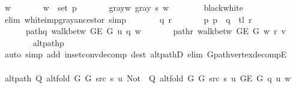 \begin{isabellebody}
\ w\ \isanewline
\ \ \ \ \ \ {\isachardoublequoteopen}w\ {\isasymin}\ set\ p{\isachardoublequoteclose}\ \isanewline
\ \ \ \ \ \ gray{\isacharunderscore}{\kern0pt}w{\isacharcolon}{\kern0pt}\ {\isachardoublequoteopen}gray\ s\ w{\isachardoublequoteclose}\isanewline
\ \ \ \ \ \ \isamarkupfalse%
\ black{\isacharunderscore}{\kern0pt}white\isanewline
\ \ \ \ \ \ \isamarkupfalse%
\ {\isacharparenleft}{\kern0pt}elim\ white{\isacharunderscore}{\kern0pt}imp{\isacharunderscore}{\kern0pt}gray{\isacharunderscore}{\kern0pt}ancestor{\isacharparenright}{\kern0pt}\ simp{\isacharplus}{\kern0pt}\isanewline
\ \ \ \ \isamarkupfalse%
\ \isamarkupfalse%
\ q\ r\ \isanewline
\ \ \ \ \ \ p{\isacharcolon}{\kern0pt}\ {\isachardoublequoteopen}p\ {\isacharequal}{\kern0pt}\ q\ {\isacharat}{\kern0pt}\ tl\ r{\isachardoublequoteclose}\ \isanewline
\ \ \ \ \ \ path{\isacharunderscore}{\kern0pt}q{\isacharcolon}{\kern0pt}\ {\isachardoublequoteopen}walk{\isacharunderscore}{\kern0pt}betw\ {\isacharparenleft}{\kern0pt}G{\isachardot}{\kern0pt}E\ G{\isacharparenright}{\kern0pt}\ u\ q\ w{\isachardoublequoteclose}\ \isanewline
\ \ \ \ \ \ path{\isacharunderscore}{\kern0pt}r{\isacharcolon}{\kern0pt}\ {\isachardoublequoteopen}walk{\isacharunderscore}{\kern0pt}betw\ {\isacharparenleft}{\kern0pt}G{\isachardot}{\kern0pt}E\ G{\isacharparenright}{\kern0pt}\ w\ r\ v{\isachardoublequoteclose}\isanewline
\ \ \ \ \ \ \isamarkupfalse%
\ alt{\isacharunderscore}{\kern0pt}path{\isacharunderscore}{\kern0pt}p\isanewline
\ \ \ \ \ \ \isamarkupfalse%
\ {\isacharparenleft}{\kern0pt}auto\ simp\ add{\isacharcolon}{\kern0pt}\ in{\isacharunderscore}{\kern0pt}set{\isacharunderscore}{\kern0pt}conv{\isacharunderscore}{\kern0pt}decomp\ dest{\isacharcolon}{\kern0pt}\ alt{\isacharunderscore}{\kern0pt}pathD{\isacharparenleft}{\kern0pt}{}{\isacharparenright}{\kern0pt}\ elim{\isacharcolon}{\kern0pt}\ G{\isachardot}{\kern0pt}path{\isacharunderscore}{\kern0pt}vertex{\isacharunderscore}{\kern0pt}decompE{\isacharparenright}{\kern0pt}\isanewline
\ \ \ \ \isamarkupfalse%
\ {\isachardoublequoteopen}alt{\isacharunderscore}{\kern0pt}path\ {\isacharparenleft}{\kern0pt}Q\ {\isacharparenleft}{\kern0pt}alt{\isacharunderscore}{\kern0pt}fold\ G{}\ G{}\ src\ s{\isacharparenright}{\kern0pt}\ u{\isacharparenright}{\kern0pt}\ {\isacharparenleft}{\kern0pt}Not\ {\isasymcirc}\ Q\ {\isacharparenleft}{\kern0pt}alt{\isacharunderscore}{\kern0pt}fold\ G{}\ G{}\ src\ s{\isacharparenright}{\kern0pt}\ u{\isacharparenright}{\kern0pt}\ {\isacharparenleft}{\kern0pt}G{\isachardot}{\kern0pt}E\ G{\isacharparenright}{\kern0pt}\ q\ u\ w{\isachardoublequoteclose}\isanewline

\end{isabellebody}
